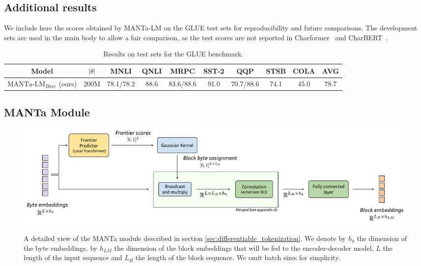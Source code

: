 \clearpage
\onecolumn

\subsection{Additional results}
We include here the scores obtained by MANTa-LM on the GLUE test sets for reproducibility and future comparisons. The development sets are used in the main body to allow a fair comparison, as the test scores are not reported in Charformer~\cite{tay2021charformer} and CharBERT~\cite{ma-etal-2020-charbert}.

\begin{table}[!htp]
\centering\small
\begin{tabular}{cccccccccc}
\toprule
Model                                   & $|\theta|$ & MNLI      & QNLI & MRPC      & SST-2 & QQP       & STSB & COLA & AVG  \\ \midrule
$\text{MANTa-LM}_{Base}$ (ours)     & 200M        & 78.1/78.2 & 88.6 & 83.6/88.6 & 91.0  & 70.7/88.6 & 74.1 & 45.0 & 78.7\\ [3pt] \bottomrule
\end{tabular}
\caption{Results on test sets for the GLUE benchmark.}
\label{tab:glue_test}
\end{table}

\subsection{MANTa Module}
\label{sec:appendix_detailled}

\begin{figure}[!htp]
\centering\label{fig:detailled_diagram}
\includegraphics[width=\linewidth]{sources/part_2/manta/images/MANTa_Tokenization_Module.pdf}
\caption{A detailed view of the MANTa module described in section \ref{sec:differentiable_tokenization}. We denote by $h_b$ the dimension of the byte embeddings, by $h_{LM}$ the dimension of the block embeddings that will be fed to the encoder-decoder model, $L$ the length of the input sequence and $L_B$ the length of the block sequence. We omit batch sizes for simplicity.}
\end{figure}

